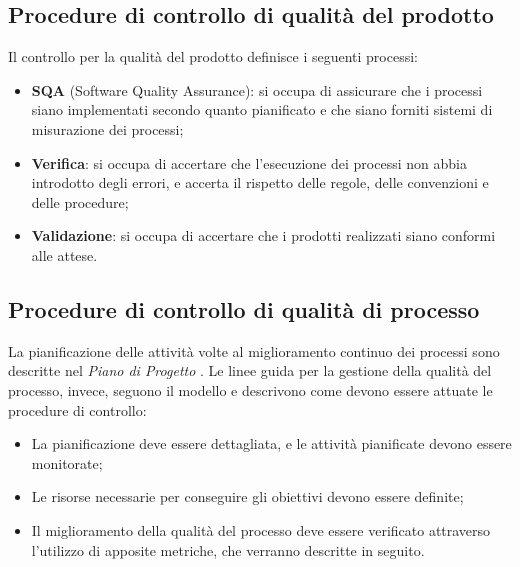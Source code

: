   \subsection{Procedure di controllo di qualità del prodotto}
    Il controllo per la qualità del prodotto definisce i seguenti processi:
    \begin{itemize}
      \item \textbf{SQA} (Software Quality Assurance): si occupa di assicurare
      che i processi siano implementati secondo quanto pianificato e che siano
      forniti sistemi di misurazione dei processi;
      \item \textbf{Verifica}: si occupa di accertare che l'esecuzione dei
      processi non abbia introdotto degli errori, e accerta il rispetto delle
      regole, delle convenzioni e delle procedure;
      \item \textbf{Validazione}: si occupa di accertare che i prodotti
      realizzati siano conformi alle attese.
    \end{itemize}

  \subsection{Procedure di controllo di qualità di processo}
  La pianificazione delle attività volte al miglioramento continuo dei processi
  sono descritte nel \emph{Piano di Progetto \VersionePP{}}. Le linee guida per
  la gestione della qualità del processo, invece, seguono il modello  e
  descrivono come devono essere attuate le procedure di controllo:
  \begin{itemize}
    \item La pianificazione deve essere dettagliata, e le attività pianificate
    devono essere monitorate;
    \item Le risorse necessarie per conseguire gli obiettivi devono essere
    definite;
    \item Il miglioramento della qualità del processo deve essere verificato
    attraverso l'utilizzo di apposite metriche, che verranno descritte in seguito.
  \end{itemize}

